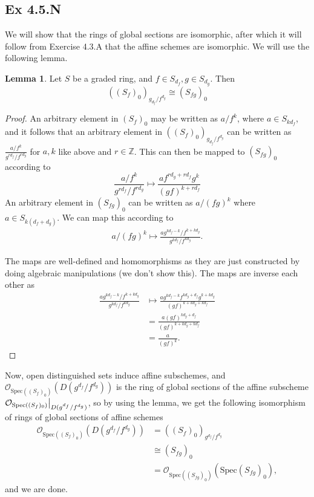 \documentclass{article}
\newcommand\restr[2]{{%
  \left.\kern-\nulldelimiterspace %
  #1 %
  \vphantom{\big|} %
  \right|_{#2} %
  }}
\theoremstyle{definition}
\newtheorem{lemma}[theorem]{Lemma}
\newcommand{\Z}{\mathbb{Z}}
\newcommand{\oo}{\mathcal{O}}
\newcommand{\osp}[1]{\oo_{\Spec\left(#1\right)}}
\newcommand{\Spec}{\text{Spec}}
\begin{document}
\subsection*{Ex 4.5.N}

We will show that the rings of global sections are isomorphic, after which it
will follow from Exercise 4.3.A that the affine schemes are isomorphic. We 
will use the following lemma.

\begin{lemma}
	Let $S$ be a graded ring, and $f \in S_{d_f}, g \in S_{d_g}$. Then 
	\[
		((S_{f})_0)_{g_{d_f}/f^{d_g}}
		\cong
		(S_{fg})_0
	\] 
\end{lemma}
\begin{proof}
	An arbitrary element in $(S_f)_0$ may be written as $a/f^{k}$, where $a \in
	S_{k d_f}$, and it follows that an arbitrary element in
	$((S_{f})_0)_{g_{d_f}/f^{d_g}}$ can be written as $\frac{a/f^k}{g^{r d_f} /
	f^{r d_g}}$ for $a, k$ like above and $r \in \Z$. This can then be mapped
	to $(S_{fg})_0$ according to
	\[
		\frac{a/f^k}{g^{r d_f} / f^{r d_g}}
		\mapsto
		\frac{a f^{r d_g + r d_f} g^k}{(gf)^{k + r d_f}}
	\]
	An arbitrary element in $(S_{fg})_0$ can be written as 
	$a/(fg)^{k}$ where $a \in S_{k (d_f + d_g)}$. We can map
	this according to 
	\begin{align*}
		a/(fg)^{k}
		\mapsto
		\frac{a g^{kd_f - k}/f^{k + k d_g}}{g^{k d_f} / f^{k d_g}}.
	\end{align*}

	The maps are well-defined and homomorphisms as they are just constructed by
	doing algebraic manipulations (we don't show this). The maps are inverse
	each other as 
	\begin{align*}
		\frac{a g^{kd_f - k}/f^{k + k d_g}}{g^{k d_f} / f^{k d_g}}
		&\mapsto
		\frac{
			a g^{kd_f - k} f^{k d_g + d_f} g^{k + kd_g}
		}{
			(gf)^{k + kd_g + kd_f}
		} \\
		&=
		\frac{
			a (gf)^{k d_g + d_f}
		}{
			(gf)^{k + kd_g + kd_f}
		} \\
		&=
		\frac{
			a 
		}{
			(gf)^{k}
		}.
	\end{align*}

\end{proof}


Now, open distinguished sets induce affine subschemes, and
$\osp{(S_f)_0}(D(g^{d_f}/f^{d_g}))$ is the ring of global sections of
the affine subscheme $\restr{\osp{(S_f)_0}}{D(g^{d_f}/f^{d_g})}$, so by
using the lemma, we get the following isomorphism of rings of global sections
of affine schemes
\begin{align*}
	\osp{(S_f)_0}(D(g^{d_f}/f^{d_g}))
	&=
	((S_f)_0)_{g^{d_f}/f^{d_g}} \\
	&\cong
	(S_{fg})_0 \\
	&=
	\osp{(S_{fg})_0}(\Spec(S_{fg})_0),
\end{align*}
and we are done.
\end{document}
